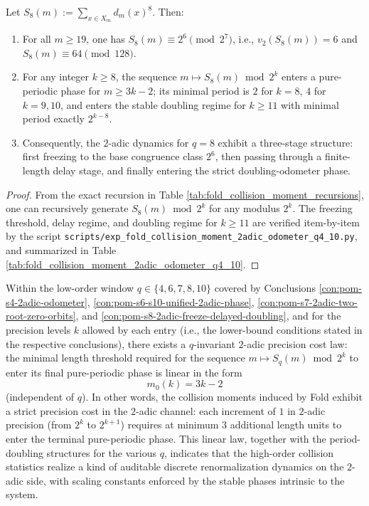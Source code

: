 \begin{conclusion}[High-Order Freezing and Delayed Doubling for \texorpdfstring{$q=8$}{q=8}: Base Congruence Class \texorpdfstring{$2^6$}{64}]\label{con:pom-s8-2adic-freeze-delayed-doubling}
Let \(S_8(m):=\sum_{x\in X_m} d_m(x)^8\).
Then:
\begin{enumerate}
  \item For all \(m\ge 19\), one has \(S_8(m)\equiv 2^6\pmod{2^7}\), i.e., \(v_2(S_8(m))=6\) and \(S_8(m)\equiv 64\pmod{128}\).
  \item For any integer \(k\ge 8\), the sequence \(m\mapsto S_8(m)\bmod 2^k\) enters a pure-periodic phase for \(m\ge 3k-2\);
  its minimal period is \(2\) for \(k=8\), \(4\) for \(k=9,10\), and enters the stable doubling regime for \(k\ge 11\) with minimal period exactly \(2^{k-8}\).
  \item Consequently, the \(2\)-adic dynamics for \(q=8\) exhibit a three-stage structure: first freezing to the base congruence class \(2^6\), then passing through a finite-length delay stage, and finally entering the strict doubling-odometer phase.
\end{enumerate}
\end{conclusion}
\begin{proof}
From the exact recursion in Table \ref{tab:fold_collision_moment_recursions}, one can recursively generate \(S_8(m)\bmod 2^k\) for any modulus \(2^k\).
The freezing threshold, delay regime, and doubling regime for \(k\ge 11\) are verified item-by-item by the script \texttt{scripts/exp\_fold\_collision\_moment\_2adic\_odometer\_q4\_10.py}, and summarized in Table \ref{tab:fold_collision_moment_2adic_odometer_q4_10}.
\end{proof}
\begin{conclusion}[Universal Three-Steps-Per-Bit Cost: Entry Threshold to \(2\)-adic Stable Phase is Always \texorpdfstring{$m=3k-2$}{m=3k-2}]\label{con:pom-collision-moment-2adic-threshold-3k-2}
Within the low-order window \(q\in\{4,6,7,8,10\}\) covered by Conclusions \ref{con:pom-s4-2adic-odometer}, \ref{con:pom-s6-s10-unified-2adic-phase}, \ref{con:pom-s7-2adic-two-root-zero-orbits}, and \ref{con:pom-s8-2adic-freeze-delayed-doubling},
and for the precision levels \(k\) allowed by each entry (i.e., the lower-bound conditions stated in the respective conclusions),
there exists a \(q\)-invariant \(2\)-adic precision cost law:
the minimal length threshold required for the sequence \(m\mapsto S_q(m)\bmod 2^k\) to enter its final pure-periodic phase is linear in the form
\[
m_0(k)=3k-2
\]
(independent of \(q\)).
In other words, the collision moments induced by Fold exhibit a strict precision cost in the \(2\)-adic channel: each increment of \(1\) in \(2\)-adic precision (from \(2^k\) to \(2^{k+1}\)) requires at minimum \(3\) additional length units to enter the terminal pure-periodic phase.
This linear law, together with the period-doubling structures for the various \(q\), indicates that the high-order collision statistics realize a kind of auditable discrete renormalization dynamics on the \(2\)-adic side, with scaling constants enforced by the stable phases intrinsic to the system.
\end{conclusion}
